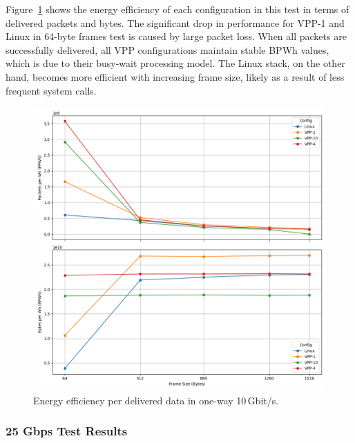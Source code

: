 Figure~\ref{fig:10g} shows the energy efficiency of each configuration in this test in terms of delivered packets and bytes.
The significant drop in performance for VPP-1 and Linux in 64-byte frames test is caused by large packet loss.
When all packets are successfully delivered, all VPP configurations maintain stable BPWh values, which is due to their busy-wait processing model.
The Linux stack, on the other hand, becomes more efficient with increasing frame size, likely as a result of less frequent system calls.

\begin{figure}[!htbp]
    \centering
    \includegraphics[width=\linewidth]{images/consumption-10g.png}
    \caption{Energy efficiency per delivered data in one-way 10\,Gbit/s.}
    \label{fig:10g}
\end{figure}



\subsubsection{25 Gbps Test Results}

